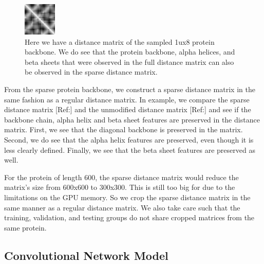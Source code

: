 \documentclass[12pt, a4paper, twocolumn, fullpage]{article}
\theoremstyle{plain}
\theoremstyle{definition}
\theoremstyle{remark}
\begin{document}
\begin{figure}[h]
    \centering
    \includegraphics[width=.7\linewidth]{1ux8pdbSparseDistM}
    \caption{Here we have a distance matrix of the sampled 1ux8 protein backbone. We do see that the protein backbone, alpha helices, and beta sheets that were observed in the full distance matrix can also be observed in the sparse distance matrix. }
    \label{1ux8pdbSparseDistM}
\end{figure}

From the sparse protein backbone, we construct a sparse distance matrix in the same fashion as a regular distance matrix. In example, we compare the sparse distance matrix [Ref:] and the unmodified distance matrix [Ref:] and see if the backbone chain, alpha helix and beta sheet features are preserved in the distance matrix. First, we see that the diagonal backbone is preserved in the matrix. Second, we do see that the alpha helix features are preserved, even though it is less clearly defined. Finally, we see that the beta sheet features are preserved as well.

For the protein of length 600, the sparse distance matrix would reduce the matrix's size from 600x600 to 300x300. This is still too big for due to the limitations on the GPU memory. So we crop the sparse distance matrix in the same manner as a regular distance matrix. We also take care such that the training, validation, and testing groups do not share cropped matrices from the same protein.

\subsection{Convolutional Network Model}
\end{document}
